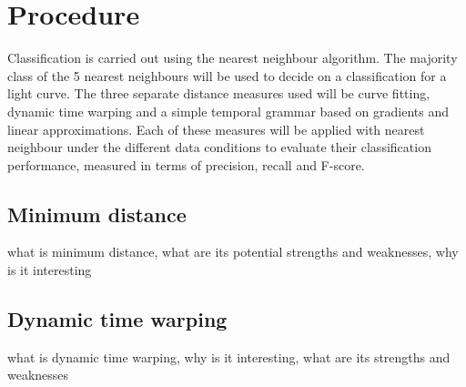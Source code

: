 \documentclass[10pt]{article}
\begin{document}
	\section{Procedure}
	\label{sec:procedure}
	Classification is carried out using the nearest neighbour algorithm. The majority class of the 5 nearest neighbours will be used to decide on a classification for a light curve. The three separate distance measures used will be curve fitting, dynamic time warping and a simple temporal grammar based on gradients and linear approximations. Each of these measures will be applied with nearest neighbour under the different data conditions to evaluate their classification performance, measured in terms of precision, recall and F-score.
	\subsection{Minimum distance}
	what is minimum distance, what are its potential strengths and weaknesses, why is it interesting
	\subsection{Dynamic time warping}
	what is dynamic time warping, why is it interesting, what are its strengths and weaknesses
	
\end{document}
